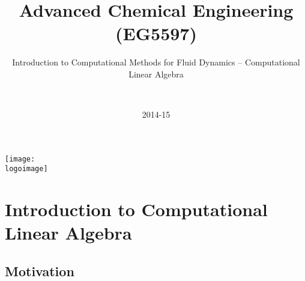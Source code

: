 \documentclass[10pt,compress]{beamer}
\institute{School of Engineering}
\title{Advanced Chemical Engineering (EG5597)}
\subtitle{Introduction to Computational Methods for Fluid Dynamics -- Computational Linear Algebra}
\date[2014-15]{2014-15}
\author[\shortname]{%
  \fullname\\\ttfamily{\emailaddress}
}
\newcommand{\logoimage}{./FigBanner/UoAHorizBanner}
\begin{document}
\begin{frame}
  \titlepage
  \vfill%
  \begin{center}
    \texttt{[image: \\logoimage]}
  \end{center}
\end{frame}






\section{Introduction to Computational Linear Algebra} 

\subsection{Motivation}
\end{document}
